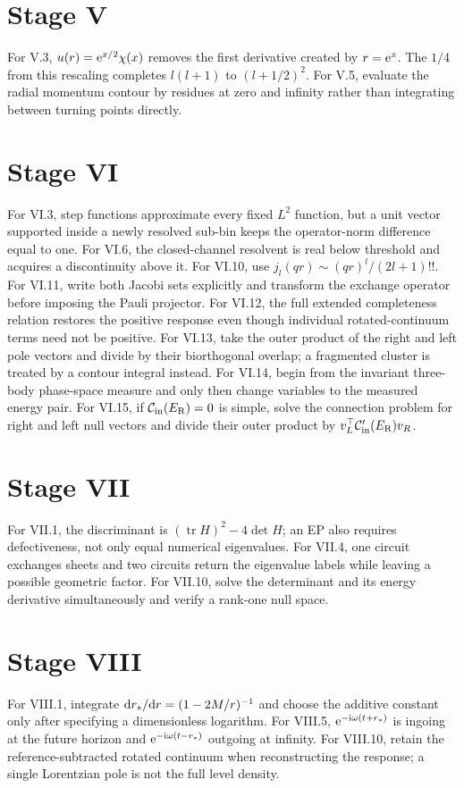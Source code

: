 \section*{Stage V}
For V.3, $u(r)=\mathrm{e}^{x/2}\chi(x)$ removes the first derivative created by
$r=\mathrm{e}^x$.  The $1/4$ from this rescaling completes $l(l+1)$ to
$(l+1/2)^2$.  For V.5, evaluate the radial momentum contour by residues at
zero and infinity rather than integrating between turning points directly.

\section*{Stage VI}
For VI.3, step functions approximate every fixed $L^2$ function, but a unit
vector supported inside a newly resolved sub-bin keeps the operator-norm
difference equal to one.  For VI.6, the closed-channel resolvent is real below
threshold and acquires a discontinuity above it.  For VI.10, use
$j_l(qr)\sim(qr)^l/(2l+1)!!$.
For VI.11, write both Jacobi sets explicitly and transform the exchange
operator before imposing the Pauli projector.  For VI.12, the full extended
completeness relation restores the positive response even though individual
rotated-continuum terms need not be positive.  For VI.13, take the outer
product of the right and left pole vectors and divide by their biorthogonal
overlap; a fragmented cluster is treated by a contour integral instead.
For VI.14, begin from the invariant three-body phase-space measure and only
then change variables to the measured energy pair.  For VI.15, if
$\mathcal{C}_{\mathrm{in}}(E_{\mathrm{R}})=0$ is simple, solve the connection problem for right and
left null vectors and divide their outer product by
$v_L^\top\mathcal{C}_{\mathrm{in}}'(E_{\mathrm{R}})v_R$.

\section*{Stage VII}
For VII.1, the discriminant is
$(\operatorname{tr}H)^2-4\det H$; an EP also requires defectiveness, not only
equal numerical eigenvalues.  For VII.4, one circuit exchanges sheets and two
circuits return the eigenvalue labels while leaving a possible geometric
factor.  For VII.10, solve the determinant and its energy derivative
simultaneously and verify a rank-one null space.

\section*{Stage VIII}
For VIII.1, integrate $\mathrm{d} r_*/\mathrm{d} r=(1-2M/r)^{-1}$ and choose the additive
constant only after specifying a dimensionless logarithm.  For VIII.5,
$\mathrm{e}^{-\mathrm{i}\omega(t+r_*)}$ is ingoing at the future horizon and
$\mathrm{e}^{-\mathrm{i}\omega(t-r_*)}$ outgoing at infinity.  For VIII.10, retain the
reference-subtracted rotated continuum when reconstructing the response; a
single Lorentzian pole is not the full level density.

